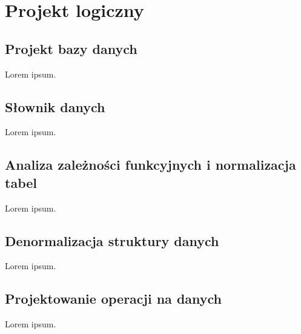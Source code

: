 \chapter{Projekt logiczny}
\label{cha:logiczny}

\section{Projekt bazy danych}
\label{sec:bazadanych}

Lorem ipsum.


\section{Słownik danych}
\label{sec:slownik}

Lorem ipsum.


\section{Analiza zależności funkcyjnych i normalizacja tabel}
\label{sec:normalizacja}

Lorem ipsum.


\section{Denormalizacja struktury danych}
\label{sec:denormalizacja}

Lorem ipsum.


\section{Projektowanie operacji na danych}
\label{sec:operacje}

Lorem ipsum.